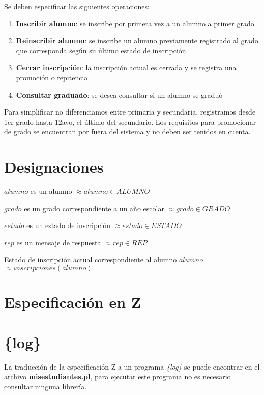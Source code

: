 \documentclass{article}
\newcommand{\desig}[2]{\item #1 $\approx #2$}
\newenvironment{designations}
  {\begin{leftbar}
    \begin{list}{}{\setlength{\labelsep}{0cm}
                   \setlength{\labelwidth}{0cm}
                   \setlength{\listparindent}{0cm}
                   \setlength{\rightmargin}{\leftmargin}}}
  {\end{list}\end{leftbar}}
\begin{document}
Se deben especificar las siguientes operaciones:

\begin{enumerate}
  \item \textbf{Inscribir alumno}: se inscribe por primera vez a un alumno a primer grado
  
  \item \textbf{Reinscribir alumno}: se inscribe un alumno previamente registrado al grado que corresponda según su último estado de inscripción
  
  \item \textbf{Cerrar inscripción}: la inscripción actual es cerrada y se registra una promoción o repitencia
  
  \item \textbf{Consultar graduado}: se desea consultar si un alumno se graduó
\end{enumerate}

Para simplificar no diferenciamos entre primaria y secundaria, registramos desde 1er grado hasta 12avo, el último del secundario. Los requisitos para promocionar de grado se encuentran por fuera del sistema y no deben ser tenidos en cuenta.

\section{Designaciones}

\begin{designations}
  \desig{$alumno$ es un alumno}{alumno \in ALUMNO}
  \desig{$grado$ es un grado correspondiente a un año escolar}{grado \in GRADO}
  \desig{$estado$ es un estado de inscripción}{estado \in ESTADO}
  \desig{$rep$ es un mensaje de respuesta}{rep \in REP}
  \desig{Estado de inscripción actual correspondiente al alumno $alumno$}{inscripciones(alumno)}
\end{designations}

\section{Especificación en Z}


\section{\{log\}}
La traducción de la especificación Z a un programa \emph{\{log\}} se puede encontrar en el archivo \textbf{misestudiantes.pl}, para ejecutar este programa no es necesario consultar ninguna librería.
\end{document}
